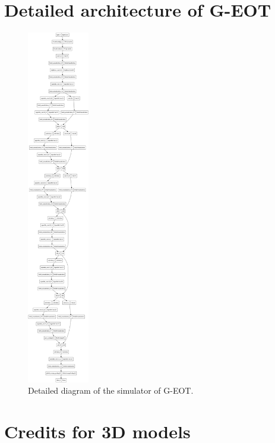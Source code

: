 \chapter{Detailed architecture of G-EOT}
    \label{app:detailed_architecture}

\begin{figure}[h]
    \centering
    \includegraphics[width=0.24\textwidth]{graphics/detailed_simulator.png}
    \caption{Detailed diagram of the simulator of G-EOT.}
\end{figure}

\chapter{Credits for 3D models}
    \label{app:model_credits}

